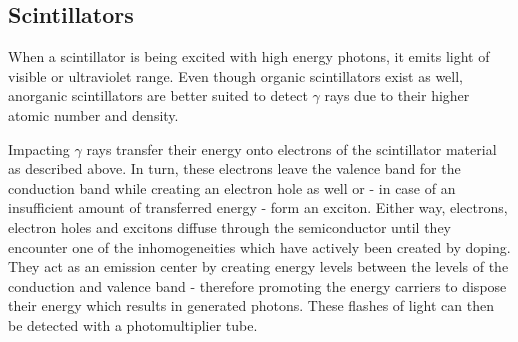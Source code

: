 \subsection*{Scintillators}
When a scintillator is being excited with high energy photons, it emits light of visible or ultraviolet range.
Even though organic scintillators exist as well, anorganic scintillators are better suited to detect $\gamma$ rays due to their higher atomic number and density. \cite{Anleitung}
%
\par
%
Impacting $\gamma$ rays transfer their energy onto electrons of the scintillator material as described above.
In turn, these electrons leave the valence band for the conduction band while creating an electron hole as well or - in case of an insufficient amount of transferred energy - form an exciton.
Either way, electrons, electron holes and excitons diffuse through the semiconductor until they encounter one of the inhomogeneities which have actively been created by doping.
They act as an emission center by creating energy levels between the levels of the conduction and valence band - therefore promoting the energy carriers to dispose their energy which results in generated photons.
These flashes of light can then be detected with a photomultiplier tube.
